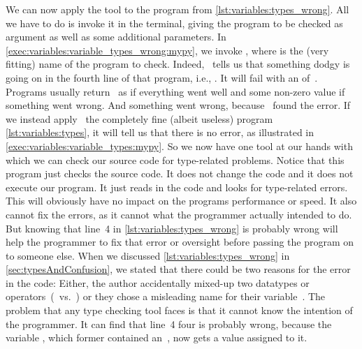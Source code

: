We can now apply the tool to the program from \cref{lst:variables:types_wrong}.
All we have to do is invoke it in the terminal, giving the program to be checked as argument as well as some additional parameters.
In \cref{exec:variables:variable_types_wrong:mypy}, we invoke , where  is the (very fitting) name of the program to check.
Indeed, \mypy\ tells us that something dodgy is going on in the fourth line of that program, i.e., .
It will fail with an  of~.
Programs usually return~ as  if everything went well and some non-zero value if something went wrong.
And something went wrong, because \mypy\ found the error.%
%
%
%
If we instead apply \mypy\ the completely fine (albeit useless) program \cref{lst:variables:types}, it will tell us that there is no error, as illustrated in \cref{exec:variables:variable_types:mypy}.
So we now have one tool at our hands with which we can check our source code for type-related problems.
Notice that this program just checks the source code.
It does not change the code and it does not execute our program.
It just reads in the code and looks for type-related errors.
This will obviously have no impact on the programs performance or speed.
It also cannot fix the errors, as it cannot what the programmer actually intended to do.
But knowing that line~4 in \cref{lst:variables:types_wrong} is probably wrong will help the programmer to fix that error or oversight before passing the program on to someone else.%
%
%
%
\endhsection%
%
%
\label{sec:varTypeHints}%
%
When we discussed \cref{lst:variables:types_wrong} in \cref{sec:typesAndConfusion}, we stated that there could be two reasons for the error in the code:
Either, the author accidentally mixed-up two datatypes or operators~(\pythonilIdx{/}~vs.~\pythonilIdx{//}) or they chose a misleading name for their variable~.
The problem that any type checking tool faces is that it cannot know the intention of the programmer.
It can find that line~4 four is probably wrong, because the variable , which former contained an~, now gets a  value assigned to it.

